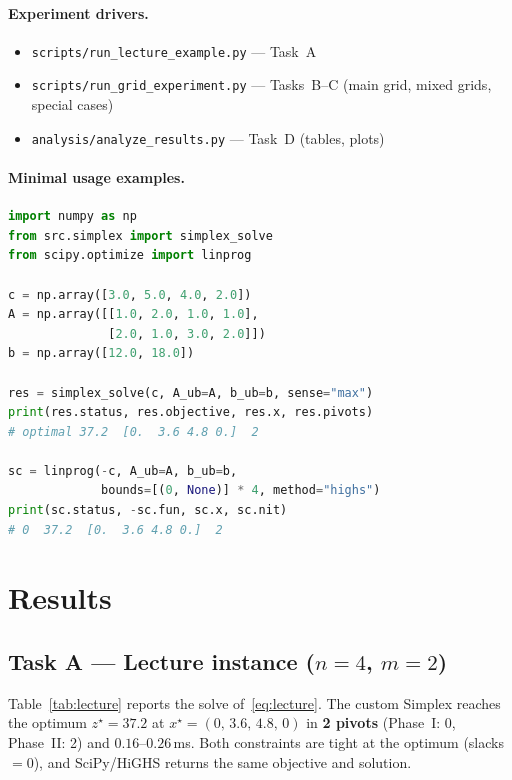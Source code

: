 \documentclass[10pt]{article}
\begin{document}
\paragraph{Experiment drivers.}
\begin{itemize}[nosep]
  \item \texttt{scripts/run\_lecture\_example.py} --- Task~A
  \item \texttt{scripts/run\_grid\_experiment.py} --- Tasks~B--C
        (main grid, mixed grids, special cases)
  \item \texttt{analysis/analyze\_results.py} --- Task~D (tables, plots)
\end{itemize}

\paragraph{Minimal usage examples.}
\begin{lstlisting}[language=Python,caption={Custom Simplex and SciPy/HiGHS on the lecture LP (Task A).}]
import numpy as np
from src.simplex import simplex_solve
from scipy.optimize import linprog

c = np.array([3.0, 5.0, 4.0, 2.0])
A = np.array([[1.0, 2.0, 1.0, 1.0],
              [2.0, 1.0, 3.0, 2.0]])
b = np.array([12.0, 18.0])

res = simplex_solve(c, A_ub=A, b_ub=b, sense="max")
print(res.status, res.objective, res.x, res.pivots)
# optimal 37.2  [0.  3.6 4.8 0.]  2

sc = linprog(-c, A_ub=A, b_ub=b,
             bounds=[(0, None)] * 4, method="highs")
print(sc.status, -sc.fun, sc.x, sc.nit)
# 0  37.2  [0.  3.6 4.8 0.]  2
\end{lstlisting}

\section{Results}
\label{sec:results}

\subsection{Task A --- Lecture instance ($n=4$, $m=2$)}
Table~\ref{tab:lecture} reports the solve of~\eqref{eq:lecture}.  The
custom Simplex reaches the optimum $z^\star = 37.2$ at
$x^\star = (0,\,3.6,\,4.8,\,0)$ in \textbf{2 pivots}
(Phase~I: 0, Phase~II: 2) and $0.16$--$0.26$\,ms.  Both constraints are
tight at the optimum (slacks $=0$), and SciPy/HiGHS returns the same
objective and solution.
\end{document}
